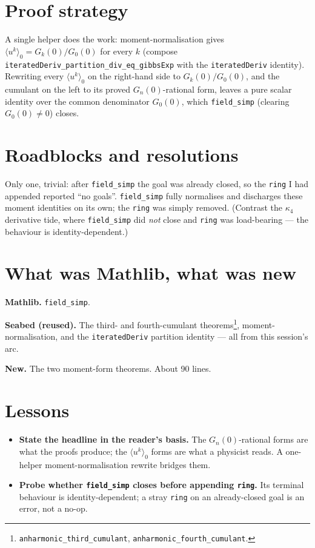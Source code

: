 \documentclass[11pt]{article}
\begin{document}
\section{Proof strategy}

A single helper does the work: moment-normalisation gives
$\langle u^k\rangle_0 = G_k(0)/G_0(0)$ for every $k$ (compose
\texttt{iteratedDeriv\_partition\_div\_eq\_gibbsExp} with the
\texttt{iteratedDeriv} identity). Rewriting every $\langle u^k\rangle_0$ on the
right-hand side to $G_k(0)/G_0(0)$, and the cumulant on the left to its proved
$G_n(0)$-rational form, leaves a pure scalar identity over the common
denominator $G_0(0)$, which \texttt{field\_simp} (clearing $G_0(0)\neq0$) closes.

\section{Roadblocks and resolutions}

Only one, trivial: after \texttt{field\_simp} the goal was already closed, so the
\texttt{ring} I had appended reported ``no goals''. \texttt{field\_simp} fully
normalises and discharges these moment identities on its own; the \texttt{ring}
was simply removed. (Contrast the $\kappa_4$ derivative tide, where
\texttt{field\_simp} did \emph{not} close and \texttt{ring} was load-bearing ---
the behaviour is identity-dependent.)

\section{What was Mathlib, what was new}

\textbf{Mathlib.} \texttt{field\_simp}.

\textbf{Seabed (reused).} The third- and fourth-cumulant
theorems\footnote{\texttt{anharmonic\_third\_cumulant},
\texttt{anharmonic\_fourth\_cumulant}.}, moment-normalisation, and the
\texttt{iteratedDeriv} partition identity --- all from this session's arc.

\textbf{New.} The two moment-form theorems. About 90 lines.

\section{Lessons}

\begin{itemize}[itemsep=3pt]
\item \textbf{State the headline in the reader's basis.} The $G_n(0)$-rational
  forms are what the proofs produce; the $\langle u^k\rangle_0$ forms are what a
  physicist reads. A one-helper moment-normalisation rewrite bridges them.
\item \textbf{Probe whether \texttt{field\_simp} closes before appending
  \texttt{ring}.} Its terminal behaviour is identity-dependent; a stray
  \texttt{ring} on an already-closed goal is an error, not a no-op.
\end{itemize}
\end{document}

